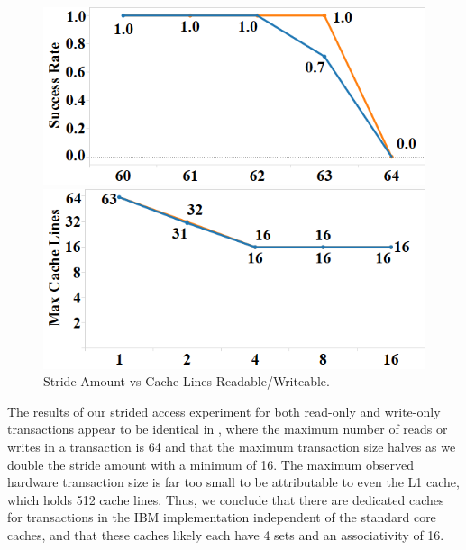 \begin{figure}[h]%
\centering
\begin{minipage}[b]{.45\linewidth}
\centering
\includegraphics[width=\linewidth]{images/wttm_capacity_readwrite_ibm}
\caption{Cache Lines Read/Written vs Success Probability. 
}
\label{fig:wttm_capacity_readwrite_ibm}
\end{minipage}%
\quad
\begin{minipage}[b]{.45\linewidth}%
\centering
\includegraphics[width=\linewidth]{images/wttm_stride_readwrite_ibm}
\caption{Stride Amount vs Cache Lines Readable/Writeable. 
}
\label{fig:wttm_stride_readwrite_ibm}
\end{minipage}
\end{figure}


The results of our strided access experiment for 
both read-only and write-only
transactions appear to be identical in
, where
the maximum number of reads or writes in a transaction
is 64 and that the maximum transaction size 
halves as we double the stride amount with a minimum
of 16.  The maximum observed hardware transaction size is far too
small to be attributable to even the {L1} cache, which holds 512 cache
lines.   Thus, we conclude that there are dedicated caches 
for transactions in the IBM implementation independent
of the standard core caches, and that
these caches likely each have 4 sets and an associativity of 16.


